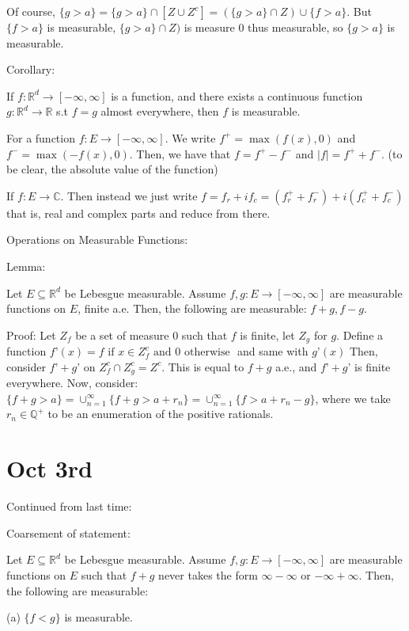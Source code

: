 \documentclass[10pt]{article}
\begin{document}
Of course, $\{ g > a \} = \{ g > a \} \cap [ Z \cup Z^c ] = (\{ g > a \} \cap Z) \cup \{ f > a \}$. But $\{ f > a \}$ is measurable, $\{ g > a \} \cap Z)$ is measure 0 thus measurable, so $\{ g > a \}$ is measurable.

Corollary:

If $f: \mathbb{R}^d \to [-\infty,\infty]$ is a function, and there exists a continuous function $g: \mathbb{R}^d \to \mathbb{R}$ s.t $f = g$ almost everywhere, then $f$ is measurable.

For a function $f: E \to [-\infty,\infty]$. We write $f^+ = \max(f(x),0)$ and $f^- = \max(-f(x),0)$. Then, we have that $f = f^+ - f^-$ and $|f| = f^+ + f^-$. (to be clear, the absolute value of the function)

If $f: E \to \mathbb{C}$. Then instead we just write $f = f_r + i f_c = (f_r^+ + f_r^-) + i (f_c^+ + f_c^-)$ that is, real and complex parts and reduce from there.

Operations on Measurable Functions:

Lemma:

Let $E \subseteq \mathbb{R}^d$ be Lebesgue measurable. Assume $f,g: E \to [-\infty,\infty]$ are measurable functions on $E$, finite a.e. Then, the following are measurable: $f+g, f-g$. 

Proof: Let $Z_f$ be a set of measure 0 such that $f$ is finite, let $Z_g$ for $g$. Define a function $f’(x) = f \text{ if } x \in Z_f^c \text{ and } 0 \text{ otherwise }$ and same with $g’(x)$ Then, consider $f’+g’$ on $Z_f^c \cap Z_g^c = Z^c$. This is equal to $f+g$ a.e., and $f’+g’$ is finite everywhere. Now, consider: $\{ f+ g > a \} = \cup_{n = 1}^\infty \{ f + g > a + r_n \} =  \cup_{n = 1}^\infty \{ f  > a + r_n - g \}$, where we take $r_n \in \mathbb{Q}^+$ to be an enumeration of the positive rationals. 

\section*{Oct 3rd}

Continued from last time:

Coarsement of statement:

Let $E \subseteq \mathbb{R}^d$ be Lebesgue measurable. Assume $f,g: E \to [-\infty,\infty]$ are measurable functions on $E$ such that $f + g$ never takes the form $\infty - \infty$ or $-\infty + \infty$. Then, the following are measurable: 

(a) $\{ f < g\}$ is measurable.
\end{document}
